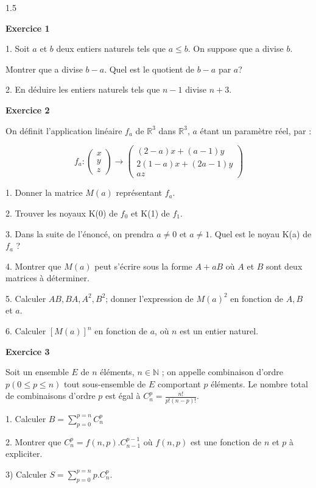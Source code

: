 \documentclass[12pt]{article}
\begin{document}
\begin{spacing}{1.5}

\textbf{Exercice 1}

1. Soit $a$ et $b$ deux entiers naturels tels que $a \leq b$. On suppose que a divise $b$.

Montrer que a divise $b-a$. Quel est le quotient de $b-a$ par $a$?

2. En déduire les entiers naturels tels que $n-1$ divise $n+3$.

\textbf{Exercice 2 }

On définit l'application linéaire $f_a$ de $\mathbb{R}^3$ dans $\mathbb{R}^3$, $a$ étant un paramètre réel, par : 

\[
f_a : \begin{pmatrix}
x\\
y\\
z
\end{pmatrix} \longrightarrow \begin{pmatrix}
(2-a)x+(a-1)y\\
2(1-a)x+(2a-1)y\\
az
\end{pmatrix}
\]
 
1. Donner la matrice $M(a)$ représentant $f_a$. 

2. Trouver les noyaux K(0) de $f_0$ et K(1) de $f_1$. 

3. Dans la suite de l'énoncé, on prendra $a \neq 0$ et $a \neq 1$. Quel est le noyau K(a) de $f_a$ ? 

4. Montrer que $M(a)$ peut s'écrire sous la forme $A + aB$ où $A$ et $B$ sont deux matrices à déterminer. 

5. Calculer $AB, BA, A^2, B^2$; donner l'expression de $M(a)^2$ en fonction de $A, B$ et $a$. 

6. Calculer $[M(a)]^n$ en fonction de $a$, où $n$ est un entier naturel.

\textbf{Exercice 3 }

Soit un ensemble $E$ de $n$ éléments, $n\in \mathbb{N}$ ; on appelle combinaison d'ordre $p (0 \leq p \leq n)$ tout sous-ensemble de $E$ comportant $p$ éléments.  
Le nombre total de combinaisons d'ordre $p$ est égal à $C_{n}^{p}=\frac{n!}{p!(n-p)!}$.

1. Calculer $B = \sum_{p=0}^{p=n}C_{n}^{p}$
 
 2. Montrer que $C_{n}^{p}=f(n,p).C_{n-1}^{p-1}$ où $f(n,p)$ est une fonction de $n$ et $p$ à expliciter. 

3) Calculer $S = \sum_{p=0}^{p=n}p.C_{n}^{p}$.


\end{spacing}
\end{document}
